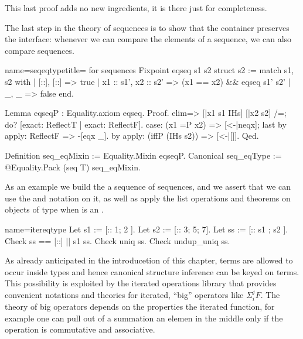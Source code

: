 This last proof adds no new ingredients, it is there just for
completeness.

The last step in the theory of sequences is to show that the container
preserves the  interface: whenever we can compare the
elements of a sequence, we can also compare sequences.

\begin{coq}{name=seqeqtype}{title= for sequences}
Fixpoint eqseq s1 s2 {struct s2} :=
  match s1, s2 with
  | [::], [::] => true
  | x1 :: s1', x2 :: s2' => (x1 == x2) && eqseq s1' s2'
  | _, _ => false
  end.

Lemma eqseqP : Equality.axiom eqseq.
Proof.
elim=> [|x1 s1 IHs] [|x2 s2] /=; do? [exact: ReflectT | exact: ReflectF].
case: (x1 =P x2) => [<-|neqx]; last by apply: ReflectF => -[eqx _].
by apply: (iffP (IHs s2)) => [<-|[]].
Qed.

Definition seq_eqMixin := Equality.Mixin eqseqP.
Canonical seq_eqType := @Equality.Pack (seq T) seq_eqMixin.
\end{coq}

As an example we build the a sequence of sequences, and we assert that
we can use the \C{==} and \C{\\in} notation on it, as well as apply
the list operations and theorems on objects of type 
when  is an .

\begin{coq}{name=itereqtype}{}
Let s1 := [:: 1; 2 ].
Let s2 := [:: 3; 5; 7].
Let ss := [:: s1 ; s2 ].
Check ss == [::] || s1 \in ss.
Check uniq ss.
Check undup_uniq ss.
\end{coq}


As already anticipated in the introducetion of this chapter, terms are
allowed to occur inside types and hence canonical structure inference
can be keyed on terms.  This possibility is exploited by the iterated
operations library that provides convenient notations and theories
for iterated, ``big'' operators like $\Sigma_i^j F$.
The theory of big operators depends on the properties the iterated
function, for example one can pull out of a summation an elemen in
the middle only if the operation is commutative and associative.


